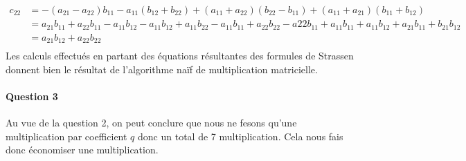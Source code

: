 \documentclass[a4paper,10pt,margin=2in]{report}
\begin{document}
\bigskip
\begin{align*}
c_{22} &= -(a_{21} - a_{22})b_{11} - a_{11}(b_{12} + b_{22}) + (a_{11} + a_{22})(b_{22} - b_{11}) + (a_{11} + a_{21})(b_{11} + b_{12})\\
&= a_{21}b_{11} + a_{22}b_{11} - a_{11}b_{12} - a_{11}b_{12} + a_{11}b_{22} - a_{11}b_{11} + a_{22}b_{22} - a{22}b_{11} + a_{11}b_{11} + a_{11}b_{12} + a_{21}b_{11} + b_{21}b_{12}\\
&= a_{21}b_{12} + a_{22}b_{22}\\
\end{align*}
Les calculs effectués en partant des équations résultantes des formules de Strassen donnent bien le résultat de l'algorithme naïf de multiplication matricielle.

\paragraph{Question 3}
Au vue de la question 2, on peut conclure que nous ne fesons qu'une multiplication par coefficient $q$ donc un total de 7 multiplication. Cela nous fais donc économiser une multiplication. 
\end{document}
